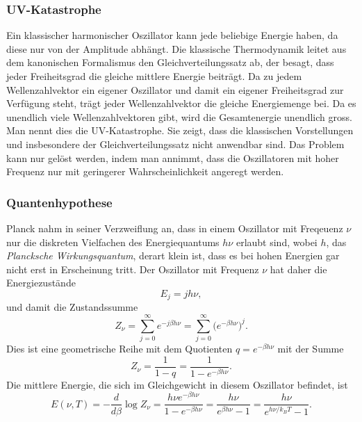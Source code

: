 \subsubsection{UV-Katastrophe}
%
Ein klassischer harmonischer Oszillator kann jede beliebige Energie haben,
da diese nur von der Amplitude abhängt.
Die klassische Thermodynamik leitet aus dem kanonischen Formalismus den
Gleichverteilungssatz ab, der besagt,
dass jeder Freiheitsgrad die gleiche mittlere Energie beiträgt.
Da zu jedem Wellenzahlvektor ein eigener Oszillator und damit ein 
eigener Freiheitsgrad zur Verfügung steht, trägt jeder Wellenzahlvektor
die gleiche Energiemenge bei.
Da es unendlich viele Wellenzahlvektoren gibt, wird die Gesamtenergie
unendlich gross.
Man nennt dies die UV-Katastrophe.
Sie zeigt, dass die klassischen Vorstellungen und insbesondere der
Gleichverteilungssatz nicht anwendbar sind.
Das Problem kann nur gelöst werden, indem man
annimmt, dass die Oszillatoren mit hoher Frequenz nur mit geringerer
Wahrscheinlichkeit angeregt werden.

\subsubsection{Quantenhypothese}
Planck nahm in seiner Verzweiflung an, dass in einem Oszillator mit
Freqeuenz $\nu$ nur die diskreten Vielfachen des Energiequantums $h\nu$ 
erlaubt sind, wobei $h$, das {\em Plancksche Wirkungsquantum}, derart
klein ist, dass es bei hohen Energien gar nicht erst in Erscheinung
tritt.
Der Oszillator mit Frequenz $\nu$ hat daher die Energiezustände
\[
E_j = jh\nu,
\]
und damit die Zustandssumme
\[
Z_\nu
=
\sum_{j=0}^\infty e^{-j\beta h\nu}
=
\sum_{j=0}^\infty \bigl(e^{-\beta h\nu}\bigr)^j.
\]
Dies ist eine geometrische Reihe mit dem Quotienten
$q=e^{-\beta h\nu}$ mit der Summe
\[
Z_\nu
=
\frac1{1-q}=\frac1{1-e^{-\beta h\nu}}.
\]
Die mittlere Energie, die sich im Gleichgewicht in diesem Oszillator 
befindet, ist
\[
E(\nu,T)
=
-\frac{d}{d\beta}\log Z_\nu
=
\frac{h\nu e^{-\beta h \nu}}{1-e^{-\beta h\nu}}
=
\frac{h\nu}{e^{\beta h\nu}-1}
=
\frac{h\nu}{e^{h\nu/k_BT}-1}.
\]

